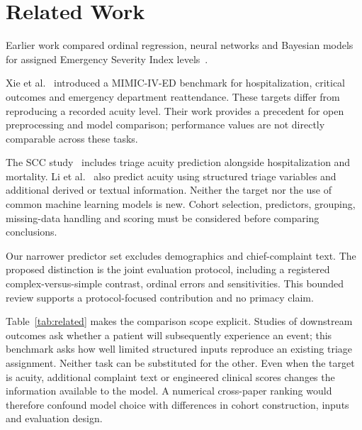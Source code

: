 \section{Related Work}
Earlier work compared ordinal regression, neural networks and Bayesian models
for assigned Emergency Severity Index levels~\cite{chonde2013comparison}.

Xie et al.~\cite{xie2022benchmark} introduced a MIMIC-IV-ED benchmark for
hospitalization, critical outcomes and emergency department reattendance.
These targets differ from reproducing a recorded acuity level. Their work
provides a precedent for open preprocessing and model comparison;
performance values are not directly comparable across these tasks.

The SCC study~\cite{scc2023prediagnosis} includes triage acuity prediction
alongside hospitalization and mortality. Li et al.~\cite{li2025hybrid} also
predict acuity using structured triage variables and additional derived or
textual information. Neither the target nor the use of common machine
learning models is new. Cohort selection, predictors, grouping, missing-data
handling and scoring must be considered before comparing conclusions.

Our narrower predictor set excludes demographics and chief-complaint text.
The proposed distinction is the joint evaluation protocol, including a
registered complex-versus-simple contrast, ordinal errors and sensitivities.
This bounded review supports a protocol-focused contribution and no primacy claim.

Table~\ref{tab:related} makes the comparison scope explicit. Studies of
downstream outcomes ask whether a patient will subsequently experience an
event; this benchmark asks how well limited structured inputs reproduce an
existing triage assignment. Neither task can be substituted for the other.
Even when the target is acuity, additional complaint text or engineered
clinical scores changes the information available to the model. A numerical
cross-paper ranking would therefore confound model choice with differences
in cohort construction, inputs and evaluation design.

